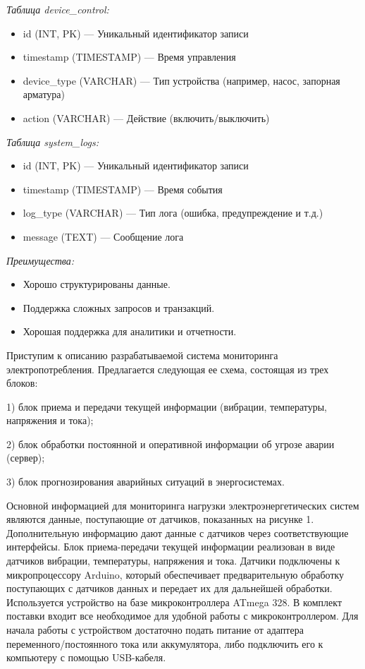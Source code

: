\emph{Таблица device\_control:}

\begin{itemize}
\item
  id (INT, PK) --- Уникальный идентификатор записи
\item
  timestamp (TIMESTAMP) --- Время управления
\item
  device\_type (VARCHAR) --- Тип устройства (например, насос, запорная
  арматура)
\item
  action (VARCHAR) --- Действие (включить/выключить)
\end{itemize}

\emph{Таблица system\_logs:}

\begin{itemize}
\item
  id (INT, PK) --- Уникальный идентификатор записи
\item
  timestamp (TIMESTAMP) --- Время события
\item
  log\_type (VARCHAR) --- Тип лога (ошибка, предупреждение и т.д.)
\item
  message (TEXT) --- Сообщение лога
\end{itemize}

\emph{Преимущества:}

\begin{itemize}
\item
  Хорошо структурированы данные.
\item
  Поддержка сложных запросов и транзакций.
\item
  Хорошая поддержка для аналитики и отчетности.
\end{itemize}

Приступим к описанию разрабатываемой система мониторинга
электропотребления. Предлагается следующая ее схема, состоящая из трех
блоков:

1) блок приема и передачи текущей информации (вибрации, температуры,
напряжения и тока);

2) блок обработки постоянной и оперативной информации об угрозе аварии
(сервер);

3) блок прогнозирования аварийных ситуаций в энергосистемах.

Основной информацией для мониторинга нагрузки электроэнергетических
систем являются данные, поступающие от датчиков, показанных на рисунке
1. Дополнительную информацию дают данные с датчиков через
соответствующие интерфейсы. Блок приема-передачи текущей информации
реализован в виде датчиков вибрации, температуры, напряжения и тока.
Датчики подключены к микропроцессору Arduino, который обеспечивает
предварительную обработку поступающих с датчиков данных и передает их
для дальнейшей обработки. Используется устройство на базе
микроконтроллера ATmega 328. В комплект поставки входит все необходимое
для удобной работы с микроконтроллером. Для начала работы с устройством
достаточно подать питание от адаптера переменного/постоянного тока или
аккумулятора, либо подключить его к компьютеру с помощью USB-кабеля.

